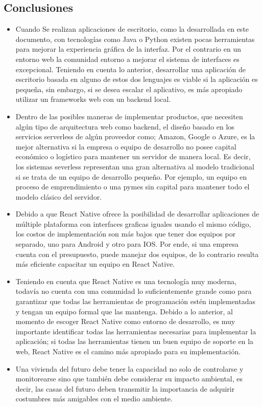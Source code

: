 	

\subsection{Conclusiones}
\begin{itemize}
	
	\item Cuando Se realizan aplicaciones de escritorio, como la desarrollada en este documento, con tecnologías como Java o Python existen pocas herramientas para mejorar la experiencia gráfica de la interfaz. Por el contrario en un entorno web la comunidad entorno a mejorar el sistema de interfaces es excepcional. Teniendo en cuenta lo anterior, desarrollar una aplicación de escritorio basada en alguno de estos dos lenguajes es viable si la aplicación es pequeña, sin embargo, si se desea escalar el aplicativo, es más apropiado utilizar un frameworks web con un backend local.
	
	\item Dentro de las posibles maneras de implementar productos, que necesiten algún tipo de arquitectura web como backend, el diseño basado en los servicios serverless de algún proveedor como; Amazon, Google o Azure, es la mejor alternativa si la empresa o equipo de desarrollo no posee capital económico o logístico para mantener un servidor de manera local. Es decir, los sistemas severless representan una gran alternativa al modelo tradicional si se trata de un equipo de desarrollo pequeño. Por ejemplo, un equipo en proceso de emprendimiento o una pymes sin capital para mantener todo el modelo clásico del servidor.
	
	\item Debido a que React Native ofrece la posibilidad de desarrollar aplicaciones de múltiple plataforma con interfaces graficas iguales usando el mismo código, los costos de implementación son más bajos que tener dos equipos por separado, uno para Android y otro para IOS. Por ende, si una empresa cuenta con el presupuesto, puede manejar dos equipos, de lo contrario resulta más eficiente capacitar un equipo en React Native.
	
	\item Teniendo en cuenta que React Native es una tecnología muy moderna, todavía no cuenta con una comunidad lo suficientemente grande como para garantizar que todas las herramientas de programación estén implementadas y tengan un equipo formal que las mantenga. Debido a lo anterior, al momento de escoger React Native como entorno de desarrollo, es muy importante identificar todas las herramientas necesarias para implementar la aplicación; si todas las herramientas tienen un buen equipo de soporte en la web, React Native es el camino más apropiado para su implementación.
	
	\item Una vivienda del futuro debe tener la capacidad no solo de controlarse y monitorearse sino que también debe considerar su impacto ambiental, es decir, las casas del futuro deben transmitir la importancia de adquirir costumbres más amigables con el medio ambiente.
	
\end{itemize}

